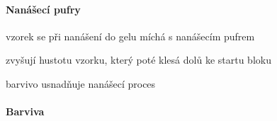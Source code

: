 \documentclass[DIV=8]{scrreprt}
\begin{document}
\paragraph{Nanášecí pufry}
\begin{myItemize}[nosep]
    \item vzorek se při nanášení do gelu míchá s nanášecím pufrem
    \item zvyšují hustotu vzorku, který poté klesá dolů ke startu bloku
    \item barvivo usnadňuje nanášecí proces
\end{myItemize}



\paragraph{Barviva}
\end{document}
